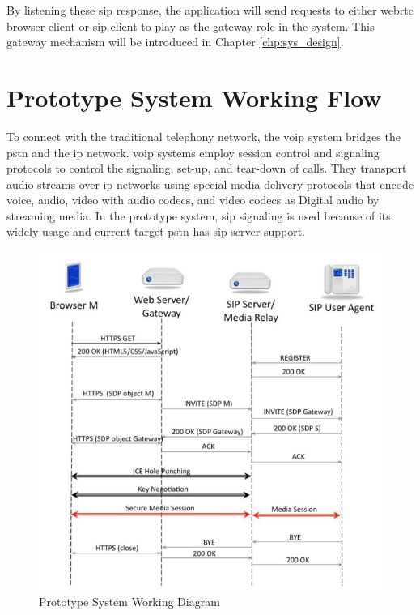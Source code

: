 \par By listening these \gls{sip} response, the application will send requests to either \gls{webrtc} browser client or \gls{sip} client to play as the gateway role in the system. This gateway mechanism will be introduced in Chapter \ref{chp:sys_design}.

\section{Prototype System Working Flow}

\noindent To connect with the traditional telephony network, the \gls{voip} system bridges the \gls{pstn} and the \gls{ip} network. \gls{voip} systems employ session control and signaling protocols to control the signaling, set-up, and tear-down of calls. They transport audio streams over \gls{ip} networks using special media delivery protocols that encode voice, audio, video with audio codecs, and video codecs as Digital audio by streaming media. In the prototype system, \gls{sip} signaling is used because of its widely usage and current target \gls{pstn} has \gls{sip} server support.

\begin{figure}
	\centering
    	\includegraphics[width=0.60\textheight,natwidth=610,natheight=642]{figs/system_work_flow.png}
  	\caption{Prototype System Working Diagram \cite{inbook:sys_work_diagram}}
  	\label{fig:sys_work_diagram}
\end{figure}

